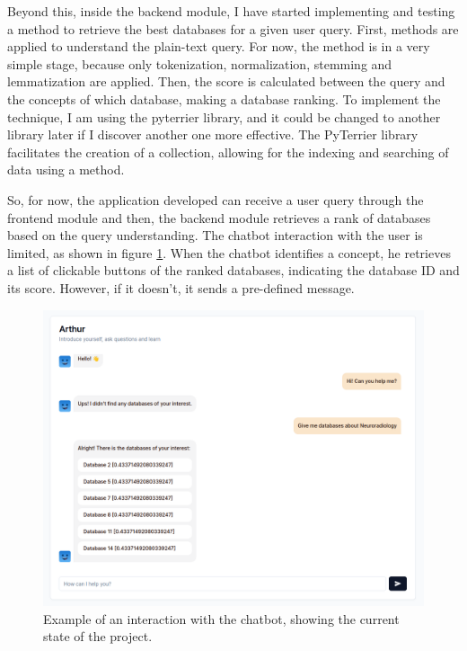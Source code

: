 Beyond this, inside the backend module, I have started implementing and testing a {\bm} method to retrieve the best databases for a given user query. First, {\nlp} methods are applied to understand the plain-text query. For now, the {\nlp} method is in a very simple stage, because only tokenization, normalization, stemming and lemmatization are applied. Then, the {\bm} score is calculated between the query and the concepts of which database, making a database ranking. To implement the {\ir} technique, I am using the pyterrier library, and it could be changed to another library later if I discover another one more effective. The PyTerrier library facilitates the creation of a collection, allowing for the indexing and searching of data using a {\bm} method.
 
So, for now, the application developed can receive a user query through the frontend module and then, the backend module retrieves a rank of databases based on the query understanding. The chatbot interaction with the user is limited, as shown in figure \ref{fig_interface}. When the chatbot identifies a concept, he retrieves a list of clickable buttons of the ranked databases, indicating the database ID and its {} score. However, if it doesn't, it sends a pre-defined message.

\begin{figure}[ht]
    \includegraphics[width=12cm]{figs/chapter3/interface.png}
    \centering
    \caption{Example of an interaction with the chatbot, showing the current state of the project.}
    \label{fig_interface}
\end{figure}



